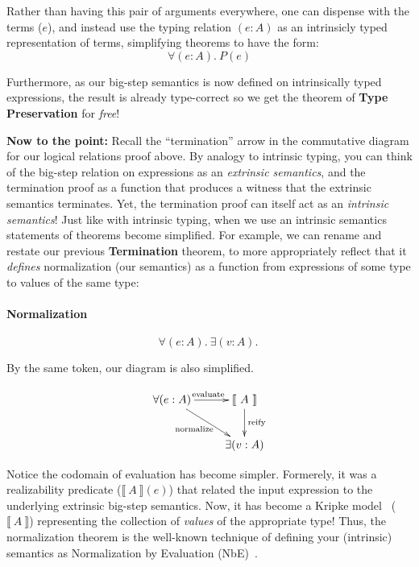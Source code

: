 \documentclass[preprint,nonatbib]{sigplanconf}
\numberwithin{subdefin}{defin}
\numberwithin{subtheorem}{theorem}
\newcommand{\ascribe}[2]{(#1 : #2)}
\newcommand{\all}[1]{\forall#1.~}
\newcommand{\ex}[1]{\exists#1.~}
\newcommand{\el}[1]{\llbracket ~ #1 ~ \rrbracket}
\newcommand{\fun}[1]{\textmd{#1}}
\begin{document}
Rather than having this pair of arguments everywhere, one can dispense with
the terms ($e$), and instead use the typing relation $\ascribe{e}{A}$
as an intrinsicly typed representation of terms, simplifying theorems to
have the form:
$$
\all{\ascribe{e}{A}} P(e)
$$

Furthermore, as our big-step semantics is now defined on intrinsically
typed expressions, the result is already type-correct so we get the
theorem of {\bf Type Preservation} for {\it free}!

{\bf Now to the point:} 
Recall the ``termination'' arrow in the commutative diagram for our
logical relations proof above. By analogy to intrinsic typing, you
can think of the big-step relation on expressions as an
{\it extrinsic semantics}, and the termination proof as a function
that produces a witness that the extrinsic semantics terminates. Yet,
the termination proof can itself act as an {\it intrinsic semantics}! 
Just like with intrinsic typing, when we use an intrinsic semantics
statements of theorems become simplified. For example, we can rename
and restate our previous {\bf Termination} theorem, to more
appropriately reflect that it {\it defines} normalization (our
semantics) as a function from expressions of some type to values of
the same type:

\paragraph{Normalization}
$$
\all{\ascribe{e}{A}} \ex{\ascribe{v}{A}}
$$

By the same token, our diagram is also simplified.

\begin{displaymath}
    \xymatrix{
          {\forall (e : A)} 
          \ar[dr]_{\fun{normalize}}
          \ar[r]^{\fun{evaluate}}
        & {\el{A}}
          \ar[d]^{\large{\fun{reify}}}
\\      & \exists (v : A) }
\end{displaymath}

Notice the codomain of evaluation has become simpler. Formerely, it
was a realizability predicate ($\el{A}(e)$) that related the input
expression to the underlying extrinsic big-step semantics. Now, it has
become a Kripke model~\cite{TODO} ($\el{A}$) representing the
collection of {\it values} of the appropriate type! Thus, the normalization
theorem is the well-known technique of defining your (intrinsic)
semantics as Normalization by Evaluation (NbE)~\cite{TODO}.
\end{document}
